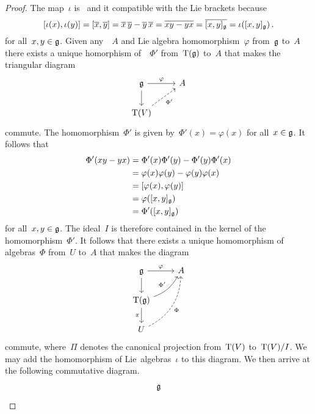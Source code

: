 \begin{proof}
  The map~$\iota$ is~{\linear{$\kf$}} and it compatible with the Lie brackets because
  \[
    [\iota(x), \iota(y)]
    =
    [\overline{x}, \overline{y}]
    =
    \overline{x} \, \overline{y} - \overline{y} \, \overline{x}
    =
    \overline{x y - y x}
    =
    \overline{[x,y]_{\mathfrak{g}}}
    =
    \iota([x,y]_{\mathfrak{g}}) \,.
  \]
  for all~$x, y \in \mathfrak{g}$.
  Given any~\algebra{$\kf$}~$A$ and Lie algebra homomorphism~$\varphi$ from~$\mathfrak{g}$ to~$A$ there exists a unique homorphism of~\algebras{$\kf$}~$\Phi'$ from~$\operatorname{T}(\mathfrak{g})$ to~$A$ that makes the triangular diagram
  \[
    \begin{tikzcd}
      \glie
      \arrow{r}[above]{\varphi}
      \arrow{d}
      &
      A
      \\
      \Tensor(V)
      \arrow[dashed]{ur}[below right]{\Phi'}
      &
      {}
    \end{tikzcd}
  \]
  commute.
  The homomorphism~$\Phi'$ is given by~$\Phi'(x) = \varphi(x)$ for all~$x \in \mathfrak{g}$.
  It follows that
  \begin{align*}
    \Phi'(x y - y x)
    &=
    \Phi'(x) \Phi'(y) - \Phi'(y) \Phi'(x)
    \\
    &=
    \varphi(x) \varphi(y) - \varphi(y) \varphi(x)
    \\
    &=
    [ \varphi(x), \varphi(y) ]
    \\
    &=
    \varphi( [x,y]_{\mathfrak{g}} )
    \\
    &=
    \Phi'( [x,y]_{\mathfrak{g}} )
  \end{align*}
  for all~$x, y \in \mathfrak{g}$.
  The ideal~$I$ is therefore contained in the kernel of the homomorphism~$\Phi'$.
  It follows that there exists a unique homomorphism of algebras~$\Phi$ from~$U$ to~$A$ that makes the diagram
  \[
    \begin{tikzcd}
      \glie
      \arrow{r}[above]{\varphi}
      \arrow{d}
      &
      A
      \\
      \Tensor(\glie)
      \arrow[bend right= 20]{ur}[above left]{\Phi'}
      \arrow{d}[left]{\pi}
      &
      {}
      \\
      U
      \arrow[dashed, bend right = 30]{uur}[below right]{\Phi}
      &
      {}
    \end{tikzcd}
  \]
  commute, where~$\Pi$ denotes the canonical projection from~$\operatorname{T}(V)$ to~$\operatorname{T}(V)/I$.
  We may add the homomorphism of Lie~algebras~$\iota$ to this diagram.
  We then arrive at the following commutative diagram.
  \[
    \begin{tikzcd}
      \glie

\end{tikzcd}\]
\end{proof}
